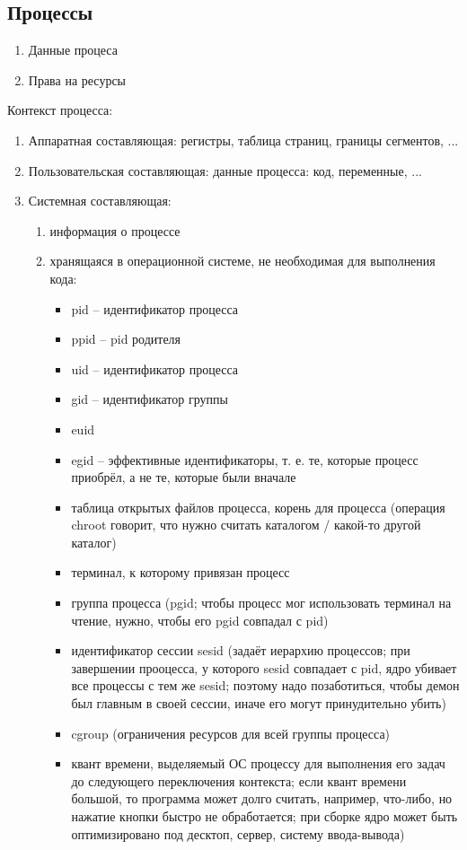\documentclass[a4paper,10pt]{article}
\begin{document}
\subsection{Процессы}
\begin{enumerate}
\item Данные процеса
\item Права на ресурсы
\end{enumerate}
Контекст процесса:
\begin{enumerate}
\item Аппаратная составляющая: регистры, таблица страниц, границы сегментов, ...
\item Пользовательская составляющая: данные процесса: код, переменные, ... 
\item Системная составляющая: 
\begin{enumerate}
\item информация о процессе
\item хранящаяся в операционной системе, не необходимая для выполнения кода: 
\begin{itemize}
\item pid -- идентификатор процесса
\item ppid -- pid родителя
\item uid -- идентификатор процесса
\item gid -- идентификатор группы
\item euid
\item egid -- эффективные идентификаторы, т. е. те, которые процесс приобрёл, а не те, которые были вначале
\item таблица открытых файлов процесса, корень для процесса (операция chroot говорит, что нужно считать каталогом / какой-то другой каталог)
\item терминал, к которому привязан процесс
\item группа процесса (pgid; чтобы процесс мог использовать терминал на чтение, нужно, чтобы его pgid совпадал с pid)
\item идентификатор сессии sesid (задаёт иерархию процессов; при завершении прооцесса, у которого sesid совпадает с pid, ядро убивает все процессы с тем же sesid; поэтому надо позаботиться, чтобы демон был главным в своей сессии, иначе его могут принудительно убить)
\item cgroup (ограничения ресурсов для всей группы процесса)
\item квант времени, выделяемый ОС процессу для выполнения его задач до следующего переключения контекста; если квант времени большой, то программа может долго считать, например, что-либо, но нажатие кнопки быстро не обработается; при сборке ядро может быть оптимизировано под десктоп, сервер, систему ввода-вывода)

\end{itemize}
\end{enumerate}
\end{enumerate}
\end{document}
